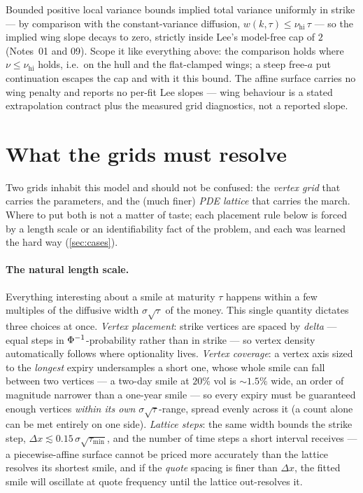 \documentclass[11pt]{article}
\begin{document}
\begin{remark}
\label{rem:lee}
Bounded positive local variance bounds implied total variance uniformly in
strike --- by comparison with the constant-variance diffusion,
$w(k,\tau)\le\nu_{\mathrm{hi}}\,\tau$ --- so the implied wing slope decays
to zero, strictly inside Lee's model-free cap of $2$ (Notes~01 and 09).
Scope it like everything above: the comparison holds where
$\nu\le\nu_{\mathrm{hi}}$ holds, i.e.\ on the hull and the flat-clamped
wings; a steep free-$a$ put continuation escapes the cap and with it this
bound.  The affine surface carries no wing penalty and reports no per-fit
Lee slopes --- wing behaviour is a stated extrapolation contract plus the
measured grid diagnostics, not a reported slope.
\end{remark}

\section{What the grids must resolve}
\label{sec:grid}

Two grids inhabit this model and should not be confused: the \emph{vertex
grid} that carries the parameters, and the (much finer) \emph{PDE lattice}
that carries the march.  Where to put both is not a matter of taste; each
placement rule below is forced by a length scale or an identifiability fact
of the problem, and each was learned the hard way (\cref{sec:cases}).

\paragraph{The natural length scale.}  Everything interesting about a smile
at maturity $\tau$ happens within a few multiples of the diffusive width
$\sigma\sqrt{\tau}$ of the money.  This single quantity dictates three
choices at once.  \emph{Vertex placement}: strike vertices are spaced by
\emph{delta} --- equal steps in $\Phi^{-1}$-probability rather than in
strike --- so vertex density automatically follows where optionality lives.
\emph{Vertex coverage}: a vertex axis sized to the \emph{longest} expiry
undersamples a short one, whose whole smile can fall between two vertices
--- a two-day smile at $20\%$ vol is $\sim1.5\%$ wide, an order of
magnitude narrower than a one-year smile --- so every expiry must be
guaranteed enough vertices \emph{within its own} $\sigma\sqrt{\tau}$-range,
spread evenly across it (a count alone can be met entirely on one side).
\emph{Lattice steps}: the same width bounds the strike step, $\Delta
x\lesssim0.15\,\sigma\sqrt{\tau_{\min}}$, and the number of time steps a
short interval receives --- a piecewise-affine surface cannot be priced
more accurately than the lattice resolves its shortest smile, and if the
\emph{quote} spacing is finer than $\Delta x$, the fitted smile will
oscillate at quote frequency until the lattice out-resolves it.
\end{document}

